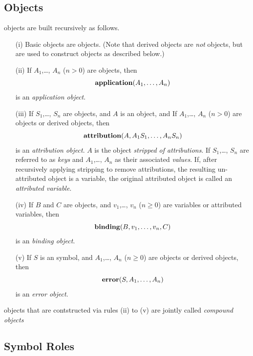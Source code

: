 \subsection{\OM Objects}\label{sec_compound}
  
\OM objects are built recursively as follows.
\begin{itemize}
\item[(i)] Basic \OM objects are \OM objects.  (Note that derived \OM objects are
  \emph{not} \OM objects, but are used to construct \OM objects as described below.)
\item[(ii)] If $A_1$,\ldots, $A_n$ ($n>0$) are \OM objects, then
  \[\mathbf{application}(A_1,\ldots,A_n)\]
  is an \OM \emph{application object}.
\item[(iii)] If $S_1$,\ldots, $S_n$ are \OM objects, and $A$ is an \OM object, and If
  $A_1$,\ldots, $A_n$ ($n>0$) are \OM objects or \OM derived objects, then
  \[\mathbf{attribution}(A, A_1 S_1,\ldots,A_n S_n)\]
  is an \OM \emph{attribution object}. $A$ is the object \emph{stripped of attributions}.
  If $S_1$,\ldots, $S_n$ are referred to as \emph{keys} and $A_1$,\ldots, $A_n$ as their
  associated \emph{values}.  If, after recursively applying stripping to remove
  attributions, the resulting un-attributed object is a variable, the original attributed
  object is called an \emph{attributed variable}.

\item[(iv)] If $B$ and $C$ are \OM objects, and $v_1$,\ldots, $v_n$ ($n\geq 0$) are \OM variables or attributed
  variables, then
  \[\mathbf{binding}(B, v_1,\ldots,v_n, C)\]
  is an \OM \emph{binding object}.

\item[(v)]  If $S$ is an \OM symbol, and $A_1$,\ldots, $A_n$ ($n\geq 0$) are \OM objects or
\OM derived objects, then
  \[\mathbf{error}(S, A_1,\ldots,A_n)\]
  is an \OM \emph{error object}.
\end{itemize}
\OM objects that are contstructed via rules (ii) to (v) are jointly called \emph{compound
  \OM objects}

\subsection{\OM Symbol Roles}\label{sec_roles}



